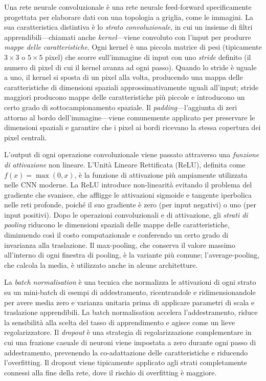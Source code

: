 Una rete neurale convoluzionale è una rete neurale feed-forward specificamente progettata per elaborare dati con una topologia a griglia, come le immagini. La sua caratteristica distintiva è lo \emph{strato convoluzionale}, in cui un insieme di filtri apprendibili---chiamati anche \emph{kernel}---viene convoluto con l'input per produrre \emph{mappe delle caratteristiche}. Ogni kernel è una piccola matrice di pesi (tipicamente $3 \times 3$ o $5 \times 5$ pixel) che scorre sull'immagine di input con uno \emph{stride} definito (il numero di pixel di cui il kernel avanza ad ogni passo). Quando lo stride è uguale a uno, il kernel si sposta di un pixel alla volta, producendo una mappa delle caratteristiche di dimensioni spaziali approssimativamente uguali all'input; stride maggiori producono mappe delle caratteristiche più piccole e introducono un certo grado di sottocampionamento spaziale. Il \emph{padding}---l'aggiunta di zeri attorno al bordo dell'immagine---viene comunemente applicato per preservare le dimensioni spaziali e garantire che i pixel ai bordi ricevano la stessa copertura dei pixel centrali.

L'output di ogni operazione convoluzionale viene passato attraverso una \emph{funzione di attivazione} non lineare. L'Unità Lineare Rettificata (ReLU), definita come $f(x) = \max(0, x)$, è la funzione di attivazione più ampiamente utilizzata nelle CNN moderne. La ReLU introduce non-linearità evitando il problema del gradiente che svanisce, che affligge le attivazioni sigmoide e tangente iperbolica nelle reti profonde, poiché il suo gradiente è zero (per input negativi) o uno (per input positivi). Dopo le operazioni convoluzionali e di attivazione, gli \emph{strati di pooling} riducono le dimensioni spaziali delle mappe delle caratteristiche, diminuendo così il costo computazionale e conferendo un certo grado di invarianza alla traslazione. Il max-pooling, che conserva il valore massimo all'interno di ogni finestra di pooling, è la variante più comune; l'average-pooling, che calcola la media, è utilizzato anche in alcune architetture.

La \emph{batch normalisation} è una tecnica che normalizza le attivazioni di ogni strato su un mini-batch di esempi di addestramento, ricentrandole e ridimensionandole per avere media zero e varianza unitaria prima di applicare parametri di scala e traslazione apprendibili. La batch normalisation accelera l'addestramento, riduce la sensibilità alla scelta del tasso di apprendimento e agisce come un lieve regolarizzatore. Il \emph{dropout} è una strategia di regolarizzazione complementare in cui una frazione casuale di neuroni viene impostata a zero durante ogni passo di addestramento, prevenendo la co-adattazione delle caratteristiche e riducendo l'overfitting. Il dropout viene tipicamente applicato agli strati completamente connessi alla fine della rete, dove il rischio di overfitting è maggiore.

